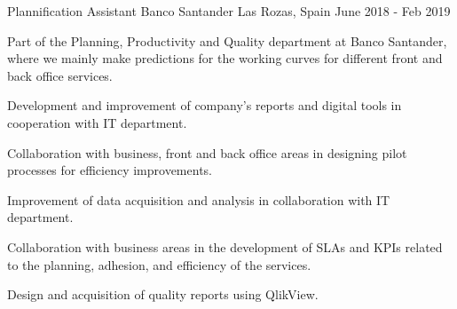 \begin{cventries}
    \cventry
    {Plannification Assistant} %
    {Banco Santander} %
    {Las Rozas, Spain} %
    {June 2018 - Feb 2019} %
    {
        \begin{cvitems} %
            \item {Part of the Planning, Productivity and Quality department at Banco Santander, where we mainly make predictions for the working curves for different front and back office services.}
            \item {Development and improvement of company’s reports and digital tools in cooperation with IT department.}
            \item {Collaboration with business, front and back office areas in designing pilot processes for efficiency improvements.}
            \item {Improvement of data acquisition and analysis in collaboration with IT department.}
            \item {Collaboration with business areas in the development of SLAs and KPIs related to the planning, adhesion, and efficiency of the services.}
            \item {Design and acquisition of quality reports using QlikView.}
        \end{cvitems}
    }

\end{cventries}
